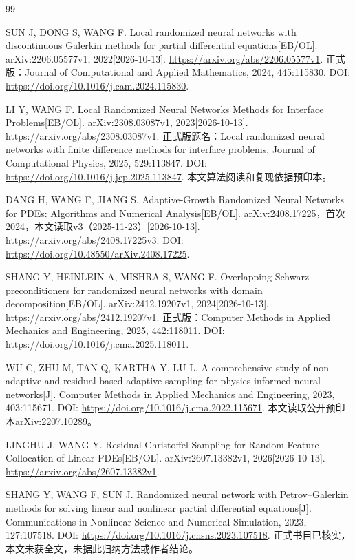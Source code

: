 \begin{thebibliography}{99}
\raggedright
{} SUN J, DONG S, WANG F. Local randomized neural networks with discontinuous Galerkin methods for partial differential equations[EB/OL]. arXiv:2206.05577v1, 2022[2026-10-13]. \url{https://arxiv.org/abs/2206.05577v1}. 正式版：Journal of Computational and Applied Mathematics, 2024, 445:115830. DOI: \url{https://doi.org/10.1016/j.cam.2024.115830}.

 LI Y, WANG F. Local Randomized Neural Networks Methods for Interface Problems[EB/OL]. arXiv:2308.03087v1, 2023[2026-10-13]. \url{https://arxiv.org/abs/2308.03087v1}. 正式版题名：Local randomized neural networks with finite difference methods for interface problems, Journal of Computational Physics, 2025, 529:113847. DOI: \url{https://doi.org/10.1016/j.jcp.2025.113847}. 本文算法阅读和复现依据预印本。

 DANG H, WANG F, JIANG S. Adaptive-Growth Randomized Neural Networks for PDEs: Algorithms and Numerical Analysis[EB/OL]. arXiv:2408.17225，首次2024，本文读取v3（2025-11-23）[2026-10-13]. \url{https://arxiv.org/abs/2408.17225v3}. DOI: \url{https://doi.org/10.48550/arXiv.2408.17225}.

 SHANG Y, HEINLEIN A, MISHRA S, WANG F. Overlapping Schwarz preconditioners for randomized neural networks with domain decomposition[EB/OL]. arXiv:2412.19207v1, 2024[2026-10-13]. \url{https://arxiv.org/abs/2412.19207v1}. 正式版：Computer Methods in Applied Mechanics and Engineering, 2025, 442:118011. DOI: \url{https://doi.org/10.1016/j.cma.2025.118011}.

 WU C, ZHU M, TAN Q, KARTHA Y, LU L. A comprehensive study of non-adaptive and residual-based adaptive sampling for physics-informed neural networks[J]. Computer Methods in Applied Mechanics and Engineering, 2023, 403:115671. DOI: \url{https://doi.org/10.1016/j.cma.2022.115671}. 本文读取公开预印本arXiv:2207.10289。

 LINGHU J, WANG Y. Residual-Christoffel Sampling for Random Feature Collocation of Linear PDEs[EB/OL]. arXiv:2607.13382v1, 2026[2026-10-13]. \url{https://arxiv.org/abs/2607.13382v1}.

 SHANG Y, WANG F, SUN J. Randomized neural network with Petrov--Galerkin methods for solving linear and nonlinear partial differential equations[J]. Communications in Nonlinear Science and Numerical Simulation, 2023, 127:107518. DOI: \url{https://doi.org/10.1016/j.cnsns.2023.107518}. 正式书目已核实，本文未获全文，未据此归纳方法或作者结论。


\end{thebibliography}

